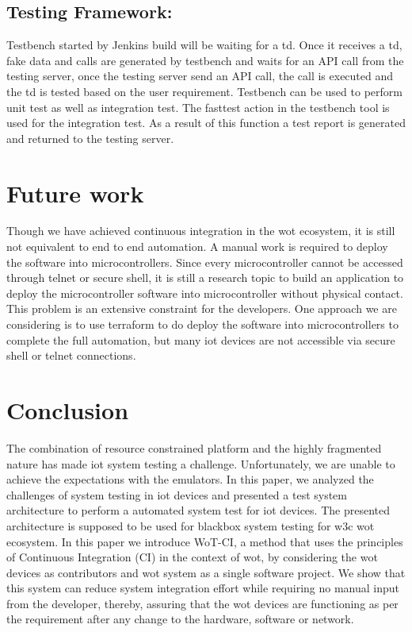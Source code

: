\documentclass[conference]{IEEEtran}
\theoremstyle{definition}
\begin{document}
\subsection{Testing Framework:}

Testbench started by Jenkins build will be waiting for a \ac{td}. 
Once it receives a \ac{td}, fake data and calls are generated by testbench and waits for an API call from the testing server, once the testing server send an API call, the call is executed and the \ac{td} is tested based on the user requirement.
Testbench can be used to perform unit test as well as integration test. 
The fasttest action in the testbench tool is used for the integration test. 
As a result of this function a test report is generated and returned to the testing server.

\section{Future work} 
Though we have achieved continuous integration in the \ac{wot} ecosystem, it is still not equivalent to end to end automation.
A manual work is required to deploy the software into microcontrollers. 
Since every microcontroller cannot be accessed through telnet or secure shell, it is still a research topic to build an application to deploy the microcontroller software into microcontroller without physical contact.  
This problem is an extensive constraint for the developers.
One approach we are considering is to use terraform to do deploy the software into microcontrollers to complete the full automation, but many \ac{iot} devices are not accessible via secure shell or telnet connections.  

\section{Conclusion}

The combination of resource constrained platform and the highly fragmented nature has made \ac{iot} system testing a challenge.
Unfortunately, we are unable to achieve the expectations with the emulators.
In this paper, we analyzed the challenges of system testing in \ac{iot} devices and presented a test system architecture to perform a automated system test for \ac{iot} devices.
The presented architecture is supposed to be used for blackbox system testing for \ac{w3c} \ac{wot} ecosystem. 
In this paper we introduce WoT-CI, a method that uses the principles of Continuous Integration (CI) in the context of \ac{wot}, by considering the \ac{wot} devices as contributors and \ac{wot} system as a single software project. We show that this system can reduce system integration effort while requiring no manual input from the developer, thereby, assuring that the \ac{wot} devices are functioning as per the requirement after any change to the hardware, software or network.
\end{document}
